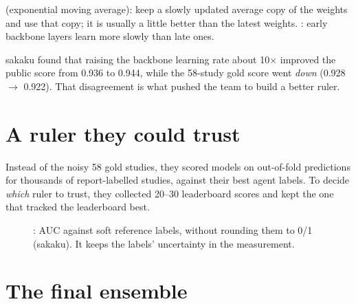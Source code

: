 \begin{wordcheck}
 (exponential moving average): keep a slowly updated average copy of the weights and use that copy;
it is usually a little better than the latest weights. : early backbone layers learn more
slowly than late ones.
\end{wordcheck}

\begin{innumbers}
sakaku found that raising the backbone learning rate about 10$\times$ improved the public score from 0.936 to 0.944,
while the 58-study gold score went \emph{down} (0.928 $\rightarrow$ 0.922). That disagreement is what pushed the team to
build a better ruler.
\end{innumbers}

\section{A ruler they could trust}

Instead of the noisy 58 gold studies, they scored models on out-of-fold predictions for thousands of report-labelled
studies, against their best agent labels. To decide \emph{which} ruler to trust, they collected 20--30 leaderboard
scores and kept the one that tracked the leaderboard best.

\begin{figure}[H]
\centering
{}
\caption{: AUC against soft reference labels, without rounding them to 0/1 (sakaku). It keeps the
labels' uncertainty in the measurement.}
\end{figure}

\section{The final ensemble}

